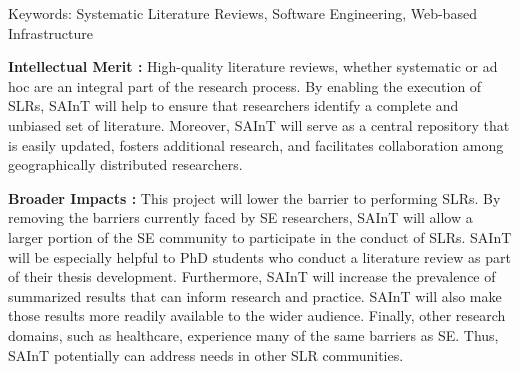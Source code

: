 Keywords: Systematic Literature Reviews, Software Engineering, Web-based Infrastructure

\textbf{Intellectual Merit :}
High-quality literature reviews, whether systematic or ad hoc are an integral part of the research process. 
By enabling the execution of SLRs, SAInT will help to ensure that researchers identify a complete and unbiased set of literature. 
Moreover, SAInT will serve as a central repository that is easily updated, fosters additional research, and facilitates collaboration among geographically distributed researchers.

\textbf{Broader Impacts :}
This project will lower the barrier to performing SLRs. 
By removing the barriers currently faced by SE researchers, SAInT will allow a larger portion of the SE community to participate in the conduct of SLRs. 
SAInT will be especially helpful to PhD students who conduct a literature review as part of their thesis development. 
Furthermore, SAInT will increase the prevalence of summarized results that can inform research and practice. 
SAInT will also make those results more readily available to the wider audience. 
Finally, other research domains, such as healthcare, experience many of the same barriers as SE. 
Thus, SAInT potentially can address needs in other SLR communities.